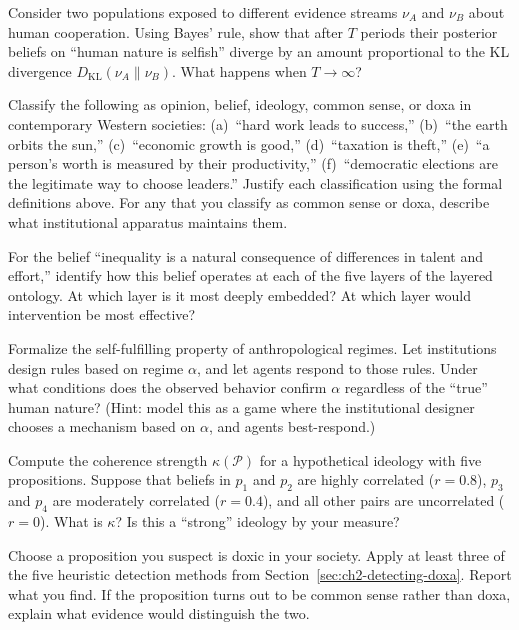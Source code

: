 \begin{exercise}
\label{ex:ch2-kl}
Consider two populations exposed to different evidence streams $\nu_A$ and $\nu_B$ about human cooperation.
Using Bayes' rule, show that after $T$ periods their posterior beliefs on ``human nature is selfish'' diverge by an amount proportional to the KL divergence $D_{\mathrm{KL}}(\nu_A \| \nu_B)$.
What happens when $T \to \infty$?
\end{exercise}

\begin{exercise}
\label{ex:ch2-classify}
Classify the following as opinion, belief, ideology, common sense, or doxa in contemporary Western societies:
(a)~``hard work leads to success,''
(b)~``the earth orbits the sun,''
(c)~``economic growth is good,''
(d)~``taxation is theft,''
(e)~``a person's worth is measured by their productivity,''
(f)~``democratic elections are the legitimate way to choose leaders.''
Justify each classification using the formal definitions above.
For any that you classify as common sense or doxa, describe what institutional apparatus maintains them.
\end{exercise}

\begin{exercise}
\label{ex:ch2-layers}
For the belief ``inequality is a natural consequence of differences in talent and effort,'' identify how this belief operates at each of the five layers of the layered ontology.
At which layer is it most deeply embedded?
At which layer would intervention be most effective?
\end{exercise}

\begin{exercise}
\label{ex:ch2-selffullfilling}
Formalize the self-fulfilling property of anthropological regimes.
Let institutions design rules based on regime $\alpha$, and let agents respond to those rules.
Under what conditions does the observed behavior confirm $\alpha$ regardless of the ``true'' human nature?
(Hint: model this as a game where the institutional designer chooses a mechanism based on $\alpha$, and agents best-respond.)
\end{exercise}

\begin{exercise}
\label{ex:ch2-coherence}
Compute the coherence strength $\kappa(\mathcal{P})$ for a hypothetical ideology with five propositions.
Suppose that beliefs in $p_1$ and $p_2$ are highly correlated ($r = 0.8$), $p_3$ and $p_4$ are moderately correlated ($r = 0.4$), and all other pairs are uncorrelated ($r = 0$).
What is $\kappa$?
Is this a ``strong'' ideology by your measure?
\end{exercise}

\begin{exercise}
\label{ex:ch2-doxa-detection}
Choose a proposition you suspect is doxic in your society.
Apply at least three of the five heuristic detection methods from Section~\ref{sec:ch2-detecting-doxa}.
Report what you find.
If the proposition turns out to be common sense rather than doxa, explain what evidence would distinguish the two.
\end{exercise}

